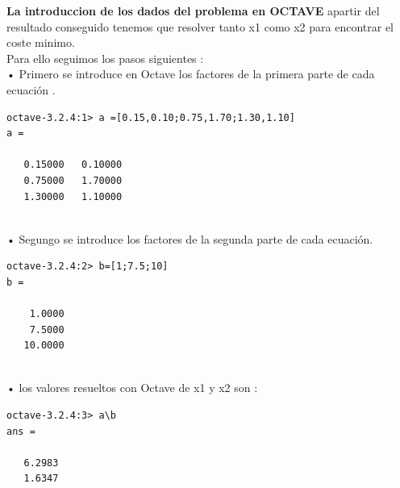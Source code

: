 \documentclass[a4,12pt]{article}
\begin{document}
\textbf {La introduccion de los dados del problema en OCTAVE} apartir del resultado conseguido  tenemos que resolver tanto x1 como x2 para encontrar el coste minimo.\\
Para ello seguimos los pasos siguientes : \\

• Primero se introduce en Octave los factores de la primera parte de cada ecuación .\\
\begin{verbatim}
octave-3.2.4:1> a =[0.15,0.10;0.75,1.70;1.30,1.10]
a =

   0.15000   0.10000
   0.75000   1.70000
   1.30000   1.10000
   
\end{verbatim}

• Segungo se introduce los factores de la segunda parte de cada ecuación.\\
\begin{verbatim}
octave-3.2.4:2> b=[1;7.5;10]
b =

    1.0000
    7.5000
   10.0000
   
\end{verbatim}

• los valores resueltos con Octave de x1 y x2 son :\\
\begin{verbatim}
octave-3.2.4:3> a\b
ans =

   6.2983
   1.6347
\end{verbatim}
\end{document}
